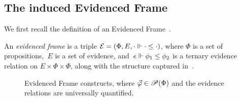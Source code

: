 \documentclass[a4paper,UKenglish,cleveref, autoref, thm-restate]{lipics-v2021}
\begin{document}
\subsection{The induced Evidenced Frame}
\label{s:EF}



We first recall the definition of an Evidenced Frame~\cite{CohMiqTat21}.



\begin{definition}\label{evidenced-frame}
An \emph{evidenced frame} is a triple $\mathcal{E} = \left( \Phi, E, \cdot \Vdash \cdot \leq \cdot \right)$, where $\Phi$ is a set of propositions,~$E$ is a set of evidence, and~\mbox{$e \Vdash \phi_1 \leq \phi_2$} is a ternary evidence relation on $E \times \Phi \times \Phi$,
along with the structure captured in~.

\end{definition}
\begin{figure}[t]
\centering

\caption{Evidenced Frame constructs, where $\vec{\varphi}\in\mathscr{P}(\Phi)$ and the evidence relations are universally quantified.}
\label{tab:EF}
\end{figure}
\end{document}
